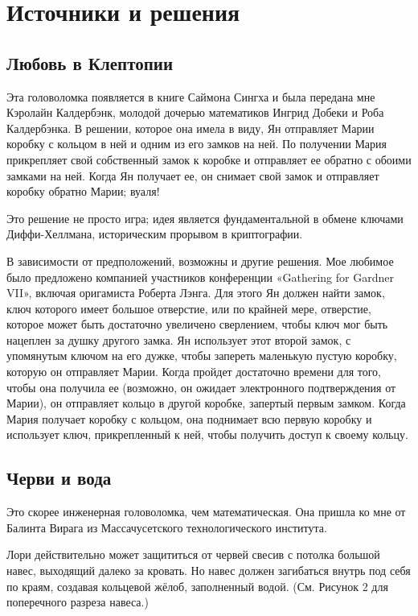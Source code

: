 \section*{Источники и решения}

\subsection*{Любовь в Клептопии}

Эта головоломка появляется в книге Саймона Сингха \cite{} и была передана мне Кэролайн Калдербэнк, молодой дочерью математиков Ингрид Добеки и Роба Калдербэнка.
В решении, которое она имела в виду, Ян отправляет Марии коробку с кольцом в ней и одним из его замков на ней. По получении Мария прикрепляет свой собственный замок к коробке и отправляет ее обратно с обоими замками на ней.
Когда Ян получает ее, он снимает свой замок и отправляет коробку обратно Марии; вуаля!

Это решение не просто игра;
идея является фундаментальной в обмене ключами Диффи-Хеллмана, историческим прорывом в криптографии.

В зависимости от предположений, возможны и другие решения.
Мое любимое было предложено компанией участников конференции
«Ga\-the\-ring for Gardner VII», включая оригамиста Роберта Лэнга.
Для этого Ян должен найти замок, ключ которого имеет большое отверстие, или по крайней мере, отверстие, которое может быть достаточно увеличено сверлением, чтобы ключ мог быть нацеплен за душку другого замка.
Ян использует этот второй замок, с упомянутым ключом на его дужке, чтобы запереть маленькую пустую коробку, которую он отправляет Марии.
Когда пройдет достаточно времени для того, чтобы она получила ее (возможно, он ожидает электронного подтверждения от Марии), он отправляет кольцо в другой коробке, запертый первым замком.
Когда Мария получает коробку с кольцом, она поднимает всю первую коробку и использует ключ, прикрепленный к ней, чтобы получить доступ к своему кольцу.

\subsection*{Черви и вода}

Это скорее инженерная головоломка, чем математическая.
Она пришла ко мне от Балинта Вирага из Массачусетского технологического института.

Лори действительно может защититься от червей свесив с потолка большой навес, выходящий далеко за кровать.
Но навес должен загибаться внутрь под себя по краям, создавая кольцевой жёлоб, заполненный водой.
(См. Рисунок 2 для поперечного разреза навеса.)

